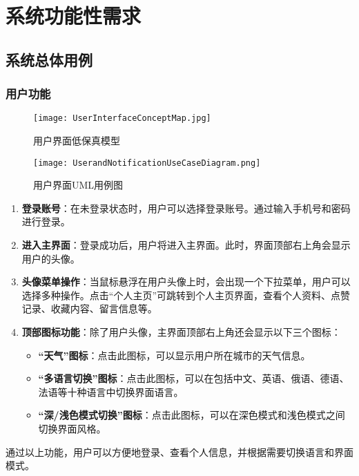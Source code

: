 \section{系统功能性需求}\label{sec:System_Functional_Requirements}

\subsection{系统总体用例}

\subsubsection{用户功能}

\begin{figure}[H]
	\centering
	\texttt{[image: UserInterfaceConceptMap.jpg]}
	\caption{用户界面低保真模型}
	\label{UserInterfaceConceptMap}
\end{figure}

\begin{figure}[htbp]
	\centering
	\texttt{[image: UserandNotificationUseCaseDiagram.png]}
	\caption{用户界面UML用例图}
	\label{UserInterfaceConceptMap}
\end{figure}

\begin{enumerate}
	\item \textbf{登录账号}：在未登录状态时，用户可以选择登录账号。通过输入手机号和密码进行登录。
	\item \textbf{进入主界面}：登录成功后，用户将进入主界面。此时，界面顶部右上角会显示用户的头像。
	\item \textbf{头像菜单操作}：当鼠标悬浮在用户头像上时，会出现一个下拉菜单，用户可以选择多种操作。点击“个人主页”可跳转到个人主页界面，查看个人资料、点赞记录、收藏内容、留言信息等。
	\item \textbf{顶部图标功能}：除了用户头像，主界面顶部右上角还会显示以下三个图标：
	\begin{itemize}
		\item \textbf{“天气”图标}：点击此图标，可以显示用户所在城市的天气信息。
		\item \textbf{“多语言切换”图标}：点击此图标，可以在包括中文、英语、俄语、德语、法语等十种语言中切换界面语言。
		\item \textbf{“深/浅色模式切换”图标}：点击此图标，可以在深色模式和浅色模式之间切换界面风格。
	\end{itemize}
\end{enumerate}

通过以上功能，用户可以方便地登录、查看个人信息，并根据需要切换语言和界面模式。

